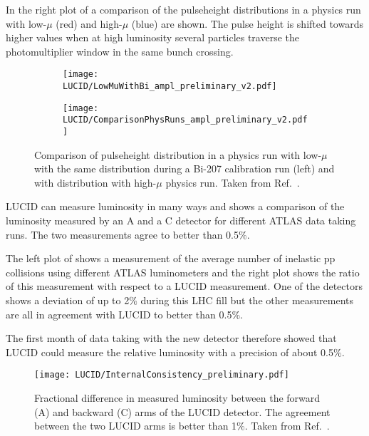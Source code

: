 In the right plot of  a comparison of the pulseheight distributions in a physics run 
with
low-$\mu$ (red) and high-$\mu$ (blue) are shown. The pulse height is shifted towards higher values when at high 
luminosity several particles traverse the photomultiplier window in the same bunch crossing.

\begin{figure}
\centering
\begin{subfigure}{.5\textwidth}
  \centering
  \texttt{[image: LUCID/LowMuWithBi\_ampl\_preliminary\_v2.pdf]}
  \label{fig:sub1}
\end{subfigure}%
\begin{subfigure}{.5\textwidth}
  \centering
  \texttt{[image: LUCID/ComparisonPhysRuns\_ampl\_preliminary\_v2.pdf]}
  \label{fig:sub2}
\end{subfigure}
\caption{Comparison of pulseheight distribution in a physics run with low-$\mu$ with the same distribution 
during a Bi-207 calibration run (left) and with distribution with high-$\mu$ physics run. Taken from Ref.~\cite{publicPlots}.}
\label{fig:Pulseheight}
\end{figure}

LUCID can measure luminosity in many ways and  shows a comparison of the 
luminosity measured by an A and 
a C detector for different ATLAS data taking runs. The two measurements agree to better than 0.5$\%$.

The left plot of  shows a measurement of the average number of inelastic pp collisions 
using different ATLAS 
luminometers and the right plot shows the ratio of this measurement with respect to a LUCID measurement. One of the 
detectors shows a deviation of up to 2$\%$ during this LHC fill but the other measurements are all in agreement 
with LUCID to better than 0.5$\%$.

The first month of data taking with the new detector therefore showed that LUCID could measure the relative 
luminosity with a precision of about 0.5$\%$.

\begin{figure}
\centering
\texttt{[image: LUCID/InternalConsistency\_preliminary.pdf]}
\caption{Fractional difference in measured luminosity between the forward (A) and backward (C) arms of the LUCID 
detector. The agreement between the two LUCID arms is better than 1$\%$. Taken from Ref.~\cite{publicPlots}.}
\label{fig:InternalConsistency}
\end{figure}


